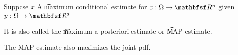 

Suppose $x$
A \t{maximum conditional estimate} for $x: \Omega \to \R^n$ given $y: \Omega \to \R^d$

It is also called the \t{maximum a posteriori estimate} or \t{MAP estimate}.


\begin{proposition}
The MAP estimate also maximizes the joint pdf.
\end{proposition}


\blankpage
